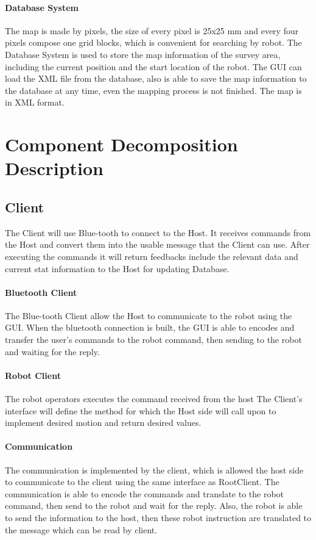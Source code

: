 \documentclass[11pt, a4paper]{report}
\begin{document}
\paragraph{Database System} The map is made by pixels, the size of every pixel is 25x25 mm and every four pixels compose one grid blocks, which is convenient for searching by robot. The Database System is used to store the map information of the survey area, including the current position and the start location of the robot. The GUI can load the XML file from the database, also is able to save the map information to the database at any time, even the mapping process is not finished. The map is in XML format. 


\section{Component Decomposition Description}
\subsection{Client} The Client will use Blue-tooth to connect to the Host.  It receives commands from the Host  and convert them into the usable message that the Client can use. After executing the commands it will return feedbacks include the relevant data and current stat information to the Host for updating Database.
\paragraph{Bluetooth Client} The Blue-tooth Client allow the Host to communicate to the robot using the GUI. When the bluetooth connection is built, the GUI is able to encodes and transfer the user's commands to the robot command, then sending to the robot and waiting for the reply.

\paragraph{Robot Client} The robot operators executes the command received from the host
The Client's interface will define the method for which the Host side will call upon to implement
desired motion and return desired values.

\paragraph{Communication} The communication is implemented by the client, which is allowed the host side to communicate to the client using the same interface as RootClient. The communication is able to encode the commands and translate to the robot command, then send to the robot and wait for the reply. Also, the robot is able to send the information to the host, then these robot  instruction are translated to the message which can be read by client.   
\end{document}
